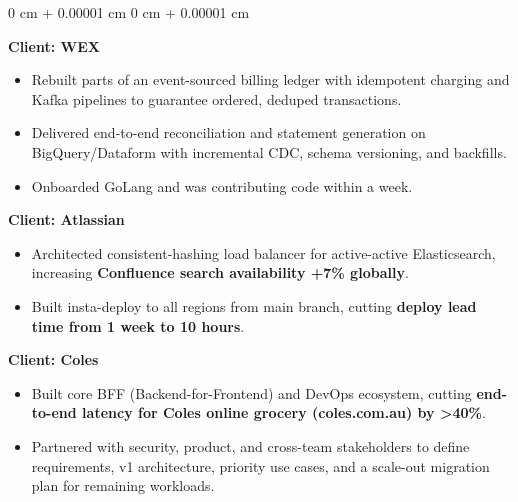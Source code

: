 \documentclass[10pt, letterpaper]{article}
\newenvironment{onecolentry}{
    \begin{adjustwidth}{
        0 cm + 0.00001 cm
    }{
        0 cm + 0.00001 cm
    }
}{
    \end{adjustwidth}
} %
\begin{document}
\begin{onecolentry}
            \vspace{0.10 cm}
            \hspace{0.5cm}\textbf{Client: WEX}
            \begin{itemize}[
                topsep=0.10 cm,
                parsep=0.10 cm,
                partopsep=0pt,
                itemsep=0pt,
                leftmargin=0 cm + 10pt + 0.5cm
            ]
                \item Rebuilt parts of an event-sourced billing ledger with idempotent charging and Kafka pipelines to guarantee ordered, deduped transactions.
                \item Delivered end-to-end reconciliation and statement generation on BigQuery/Dataform with incremental CDC, schema versioning, and backfills.
                \item Onboarded GoLang and was contributing code within a week.
            \end{itemize}
            
            \vspace{0.10 cm}
            \hspace{0.5cm}\textbf{Client: Atlassian}
            \begin{itemize}[
                topsep=0.10 cm,
                parsep=0.10 cm,
                partopsep=0pt,
                itemsep=0pt,
                leftmargin=0 cm + 10pt + 0.5cm
            ]
                \item Architected consistent-hashing load balancer for active-active Elasticsearch, increasing \textbf{Confluence search availability +7\% globally}.
                \item Built insta-deploy to all regions from main branch, cutting \textbf{deploy lead time from 1 week to 10 hours}.
            \end{itemize}
            
            \vspace{0.10 cm}
            \hspace{0.5cm}\textbf{Client: Coles}
            \begin{itemize}[
                topsep=0.10 cm,
                parsep=0.10 cm,
                partopsep=0pt,
                itemsep=0pt,
                leftmargin=0 cm + 10pt + 0.5cm
            ]
                \item Built core BFF (Backend-for-Frontend) and DevOps ecosystem, cutting \textbf{end-to-end latency for Coles online grocery (coles.com.au) by >40\%}.
                \item Partnered with security, product, and cross-team stakeholders to define requirements, v1 architecture, priority use cases, and a scale-out migration plan for remaining workloads.
            \end{itemize}
        \end{onecolentry}
\end{document}
